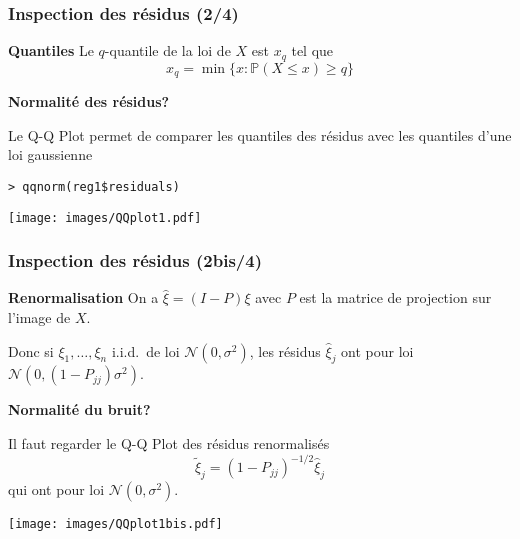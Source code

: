 \documentclass{beamer}
\begin{document}
\begin{frame}[fragile]
\frametitle{\bf Inspection des r\'esidus (2/4)}
\begin{block}{\bf Quantiles}
Le $q$-quantile de la loi de $X$ est $x_{q}$ tel que
$$x_{q}=\min\{x : \mathbb{P}(X\leq x)\geq q\}$$
\end{block}

\begin{minipage}{4.9cm}
{\bf Normalit\'e des r\'esidus?}\medskip

Le Q-Q Plot permet de comparer les quantiles des r\'esidus avec les quantiles d'une loi gaussienne
\begin{verbatim}> qqnorm(reg1$residuals)\end{verbatim}
\medskip



\end{minipage}\hfill
\begin{minipage}{5.6cm}
\begin{center}
\texttt{[image: images/QQplot1.pdf]}
\end{center}
\end{minipage}
\end{frame}

\begin{frame}[fragile]
\frametitle{\bf Inspection des r\'esidus (2bis/4)}
\begin{block}{\bf Renormalisation}
On a $\hat\xi=(I-P)\xi$ avec $P$ est la matrice de projection sur l'image de $X$.\medskip

Donc si  $\xi_{1},\ldots,\xi_{n}$ i.i.d.\ de loi $\mathcal{N}(0,\sigma^2)$, les r\'esidus $\hat \xi_{j}$
 ont pour loi $\mathcal{N}(0,(1-P_{jj})\sigma^2)$.
\end{block}

\begin{minipage}{4.9cm}
{\bf Normalit\'e du bruit?}\medskip

Il faut regarder le Q-Q Plot des r\'esidus renormalis\'es $$\tilde \xi_{j}=(1-P_{jj})^{-1/2}\hat\xi_{j}$$
qui ont pour loi $\mathcal{N}(0,\sigma^2)$.



\end{minipage}\hfill
\begin{minipage}{5cm}
\begin{center}
\texttt{[image: images/QQplot1bis.pdf]}
\end{center}
\end{minipage}
\end{frame}
\end{document}
